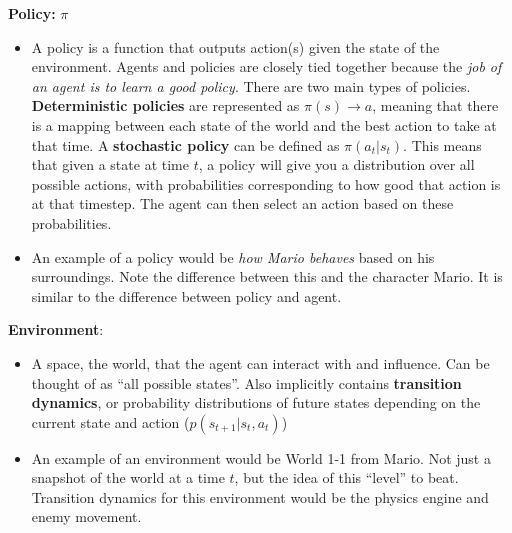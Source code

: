 \begin{flushleft}
    \textbf{Policy:} $\pi$
    \begin{itemize}
        \item A policy is a function that outputs action(s) given the state of the environment. Agents and policies are closely tied together because the \textit{job of an agent is to learn a good policy}. There are two main types of policies. \textbf{Deterministic policies} are represented as $\pi(s) \rightarrow a$, meaning that there is a mapping between each state of the world and the best action to take at that time. A \textbf{stochastic policy} can be defined as $\pi(a_t|s_t)$. This means that given a state at time $t$, a policy will give you a distribution over all possible actions, with probabilities corresponding to how good that action is at that timestep. The agent can then select an action based on these probabilities.
        \item An example of a policy would be \textit{how Mario behaves} based on his surroundings. Note the difference between this and the character Mario. It is similar to the difference between policy and agent.
    \end{itemize}

    \textbf{Environment}:
    \begin{itemize}
        \item A space, the world, that the agent can interact with and influence. Can be thought of as ``all possible states''. Also implicitly contains \textbf{transition dynamics}, or probability distributions of future states depending on the current state and action ($p(s_{t+1}|s_t,a_t)$)
        \item An example of an environment would be World 1-1 from Mario. Not just a snapshot of the world at a time $t$, but the idea of this ``level'' to beat. Transition dynamics for this environment would be the physics engine and enemy movement.
    \end{itemize}


\end{flushleft}
